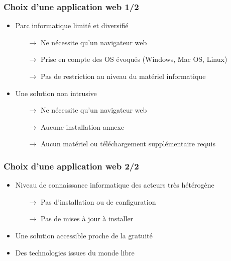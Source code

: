 \begin{frame}
  \frametitle{Choix d'une application web 1/2}
  \begin{itemize}
    \item Parc informatique limité et diversifié
      \begin{itemize}
        \item[$\rightarrow $] Ne nécessite qu'un navigateur web
        \item[$\rightarrow $] Prise en compte des OS évoqués (Windows, Mac OS, Linux)
        \item[$\rightarrow $] Pas de restriction au niveau du matériel informatique
      \end{itemize}
    \item Une solution non intrusive
      \begin{itemize}
        \item[$\rightarrow $] Ne nécessite qu'un navigateur web
        \item[$\rightarrow $] Aucune installation annexe
        \item[$\rightarrow $] Aucun matériel ou téléchargement supplémentaire requis
      \end{itemize}
\end{itemize}
\end{frame}

\begin{frame}
  \frametitle{Choix d'une application web 2/2}
  \begin{itemize}
    \item Niveau de connaissance informatique des acteurs très hétérogène
      \begin{itemize}
        \item[$\rightarrow $] Pas d'installation ou de configuration
        \item[$\rightarrow $] Pas de mises à jour à installer
      \end{itemize}
    \item Une solution accessible proche de la gratuité
    \item Des technologies issues du monde libre
  \end{itemize}
\end{frame}

